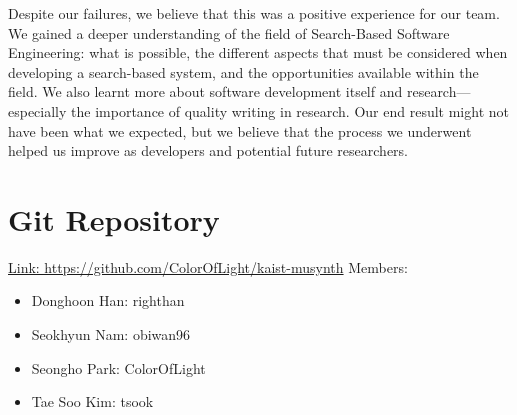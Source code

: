 \documentclass{article}
\begin{document}
Despite our failures, we believe that this was a positive experience for our team. We gained a deeper understanding of the field of Search-Based Software Engineering: what is possible, the different aspects that must be considered when developing a search-based system, and the opportunities available within the field. We also learnt more about software development itself and research---especially the importance of quality writing in research. Our end result might not have been what we expected, but we believe that the process we underwent helped us improve as developers and potential future researchers. 
 
\section{Git Repository}
\href{https://github.com/ColorOfLight/kaist-musynth}{Link: https://github.com/ColorOfLight/kaist-musynth} \newline Members:
\begin{itemize}
    \item Donghoon Han: righthan
    \item Seokhyun Nam: obiwan96
    \item Seongho Park: ColorOfLight
    \item Tae Soo Kim: tsook
\end{itemize}

\printbibliography
\end{document}
